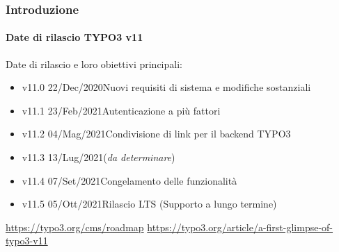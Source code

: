 %

\begin{frame}[fragile]
	\frametitle{Introduzione}
	\framesubtitle{Date di rilascio TYPO3 v11}

	Date di rilascio e loro obiettivi principali:

	\begin{itemize}
		\item
			\begingroup
				\color{typo3orange}
				v11.0 \tabto{1.1cm}22/Dec/2020\tabto{3.4cm}Nuovi requisiti di sistema e modifiche sostanziali
			\endgroup
		\item v11.1 \tabto{1.1cm}23/Feb/2021\tabto{3.4cm}Autenticazione a più fattori
		\item v11.2 \tabto{1.1cm}04/Mag/2021\tabto{3.4cm}Condivisione di link per il backend TYPO3
		\item v11.3 \tabto{1.1cm}13/Lug/2021\tabto{3.4cm}(\textit{da determinare})
		\item v11.4 \tabto{1.1cm}07/Set/2021\tabto{3.4cm}Congelamento delle funzionalità
		\item v11.5 \tabto{1.1cm}05/Ott/2021\tabto{3.4cm}Rilascio LTS (Supporto a lungo termine)

	\end{itemize}

	\smaller
		\url{https://typo3.org/cms/roadmap}\newline
		\url{https://typo3.org/article/a-first-glimpse-of-typo3-v11}
	\normalsize

\end{frame}

